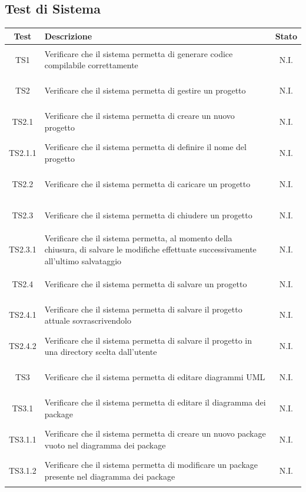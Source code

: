 \documentclass[../PianoDiQualifica.tex]{subfiles}
\begin{document}
\subsection{Test di Sistema}
\normalsize
\begin{longtable}{|c|>{\centering}p{10cm}|c|}
	\hline
	\textbf{Test} & \textbf{Descrizione} & \textbf{Stato}\\
	\hline
	\endhead
	
	\hypertarget{TS1}{TS1} & Verificare che il sistema permetta di generare codice compilabile correttamente & N.I. \\
	\hline
	\hypertarget{TS2}{TS2} & Verificare che il sistema permetta di gestire un progetto & N.I. \\
	\hline
	\hypertarget{TS2.1}{TS2.1} & Verificare che il sistema permetta di creare un nuovo progetto & N.I. \\
	\hline
	\hypertarget{TS2.1.1}{TS2.1.1} & Verificare che il sistema permetta di definire il nome del progetto & N.I. \\
	\hline
	\hypertarget{TS2.2}{TS2.2} & Verificare che il sistema permetta di caricare un progetto & N.I. \\
	\hline
	\hypertarget{TS2.3}{TS2.3} & Verificare che il sistema permetta di chiudere un progetto & N.I. \\
	\hline
	\hypertarget{TS2.3.1}{TS2.3.1} & Verificare che il sistema permetta, al momento della chiusura, di salvare le modifiche effettuate successivamente all'ultimo salvataggio & N.I. \\
	\hline
	\hypertarget{TS2.4}{TS2.4} & Verificare che il sistema permetta di salvare un progetto & N.I. \\
	\hline
	\hypertarget{TS2.4.1}{TS2.4.1} & Verificare che il sistema permetta di salvare il progetto attuale sovrascrivendolo & N.I. \\
	\hline
	\hypertarget{TS2.4.2}{TS2.4.2} & Verificare che il sistema permetta di salvare il progetto in una directory scelta dall'utente & N.I. \\
	\hline
	\hypertarget{TS3}{TS3} & Verificare che il sistema permetta di editare diagrammi UML & N.I. \\
	\hline
	\hypertarget{TS3.1}{TS3.1} & Verificare che il sistema permetta di editare il diagramma dei package & N.I. \\
	\hline
	\hypertarget{TS3.1.1}{TS3.1.1} & Verificare che il sistema permetta di creare un nuovo package vuoto nel diagramma dei package & N.I. \\
	\hline
	\hypertarget{TS3.1.2}{TS3.1.2} & Verificare che il sistema permetta di modificare un package presente nel diagramma dei package & N.I. \\

\end{longtable}
\end{document}
